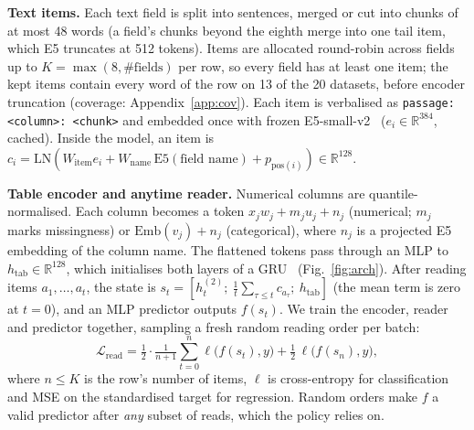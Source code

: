 \documentclass{article}
\newcommand{\htab}{h_{\mathrm{tab}}}
\begin{document}
\textbf{Text items.}
Each text field is split into sentences, merged or cut into chunks of at most 48 words (a field's chunks beyond the eighth merge into one tail item, which E5 truncates at 512 tokens).
Items are allocated round-robin across fields up to $K=\max(8,\#\text{fields})$ per row, so every field has at least one item; the kept items contain every word of the row on 13 of the 20 datasets, before encoder truncation (coverage: Appendix~\ref{app:cov}).
Each item is verbalised as \texttt{passage: <column>: <chunk>} and embedded once with frozen E5-small-v2~\cite{wang2022e5} ($e_i\in\mathbb{R}^{384}$, cached).
Inside the model, an item is
$c_i=\mathrm{LN}(W_{\text{item}}e_i + W_{\text{name}}\,\mathrm{E5}(\text{field name}) + p_{\text{pos}(i)})\in\mathbb{R}^{128}$.

\textbf{Table encoder and anytime reader.}
Numerical columns are quantile-normalised.
Each column becomes a token $x_jw_j+m_ju_j+n_j$ (numerical; $m_j$ marks missingness) or $\mathrm{Emb}(v_j)+n_j$ (categorical), where $n_j$ is a projected E5 embedding of the column name.
The flattened tokens pass through an MLP to $\htab\in\mathbb{R}^{128}$, which initialises both layers of a GRU~\cite{cho2014gru} (Fig.~\ref{fig:arch}).
After reading items $a_1,\dots,a_t$, the state is $s_t=[h^{(2)}_t;\ \tfrac1t\sum_{\tau\le t}c_{a_\tau};\ \htab]$ (the mean term is zero at $t=0$), and an MLP predictor outputs $f(s_t)$.
We train the encoder, reader and predictor together, sampling a fresh random reading order per batch:
\begin{equation}
\mathcal{L}_{\text{read}}=\tfrac12\cdot\tfrac{1}{n+1}\textstyle\sum_{t=0}^{n}\ell\big(f(s_t),y\big)+\tfrac12\,\ell\big(f(s_n),y\big),
\end{equation}
where $n\le K$ is the row's number of items, $\ell$ is cross-entropy for classification and MSE on the standardised target for regression.
Random orders make $f$ a valid predictor after \emph{any} subset of reads, which the policy relies on.
\end{document}

